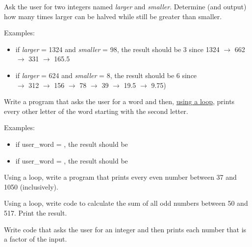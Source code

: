 

	\item  
		Ask the user for two integers named \textit{larger} and \textit{smaller}.  
		Determine (and output) how many times larger can be halved while still be 
		greater than smaller.
		
		Examples:
		\begin{itemize}
			\item if \textit{larger} = 1324 and  \textit{smaller} = 98, the result should be 3 since
				1324 $\rightarrow$ 662 $\rightarrow$ 331 $\rightarrow$ 165.5
			\item if \textit{larger} = 624 and  \textit{smaller} = 8, the result should be 6 since\\
				 $\rightarrow$ 312 $\rightarrow$ 156 $\rightarrow$ 78 $\rightarrow$ 39 
				$\rightarrow$ 19.5 $\rightarrow$ 9.75)
		\end{itemize}


	\item  
		Write a program that asks the user for a word and then, \underline{using a loop}, 
		prints every other letter of the word starting with the second letter.

		Examples:
		\begin{itemize}
			\item if user\_word = , the result should be 
			\item if user\_word = , the result should be 
		\end{itemize}


	\item  
		Using a loop, write a program that prints every even number 
		between 37 and 1050 (inclusively).


	\item  
		Using a loop, write code to calculate the sum of all odd numbers between 50 and 517. 
		Print the result.


	\item  
		Write code that asks the user for an integer and then prints each number that is a 
		factor of the input.
	
